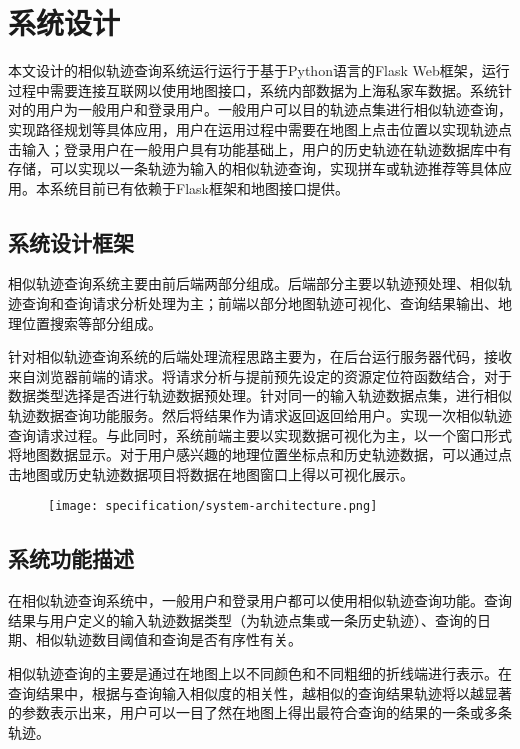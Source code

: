 
\section{系统设计}
\label{sec:overall description}
本文设计的相似轨迹查询系统运行运行于基于Python语言的Flask Web框架，运行过程中需要连接互联网以使用地图接口，系统内部数据为上海私家车数据。系统针对的用户为一般用户和登录用户。一般用户可以目的轨迹点集进行相似轨迹查询，实现路径规划等具体应用，用户在运用过程中需要在地图上点击位置以实现轨迹点击输入；登录用户在一般用户具有功能基础上，用户的历史轨迹在轨迹数据库中有存储，可以实现以一条轨迹为输入的相似轨迹查询，实现拼车或轨迹推荐等具体应用。本系统目前已有依赖于Flask框架和地图接口提供。

\subsection{系统设计框架}
\label{subsec:product perspective}
相似轨迹查询系统主要由前后端两部分组成。后端部分主要以轨迹预处理、相似轨迹查询和查询请求分析处理为主；前端以部分地图轨迹可视化、查询结果输出、地理位置搜索等部分组成。

针对相似轨迹查询系统的后端处理流程思路主要为，在后台运行服务器代码，接收来自浏览器前端的请求。将请求分析与提前预先设定的资源定位符函数结合，对于数据类型选择是否进行轨迹数据预处理。针对同一的输入轨迹数据点集，进行相似轨迹数据查询功能服务。然后将结果作为请求返回返回给用户。实现一次相似轨迹查询请求过程。与此同时，系统前端主要以实现数据可视化为主，以一个窗口形式将地图数据显示。对于用户感兴趣的地理位置坐标点和历史轨迹数据，可以通过点击地图或历史轨迹数据项目将数据在地图窗口上得以可视化展示。

\begin{figure}[!htp]
  \centering
  \texttt{[image: specification/system-architecture.png]}
\end{figure}

\subsection{系统功能描述}
\label{subsec:product functions}
在相似轨迹查询系统中，一般用户和登录用户都可以使用相似轨迹查询功能。查询结果与用户定义的输入轨迹数据类型（为轨迹点集或一条历史轨迹）、查询的日期、相似轨迹数目阈值和查询是否有序性有关。

相似轨迹查询的主要是通过在地图上以不同颜色和不同粗细的折线端进行表示。在查询结果中，根据与查询输入相似度的相关性，越相似的查询结果轨迹将以越显著的参数表示出来，用户可以一目了然在地图上得出最符合查询的结果的一条或多条轨迹。

